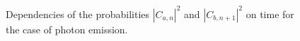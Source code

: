 \begin{figure}
\centering



\caption{Dependencies of the probabilities $\left|C_{a, n}\right|^2$ and
  $\left|C_{b, n+1}\right|^2$ on time for the case of photon emission.}
\label{fig:part1:rabi}
\end{figure}